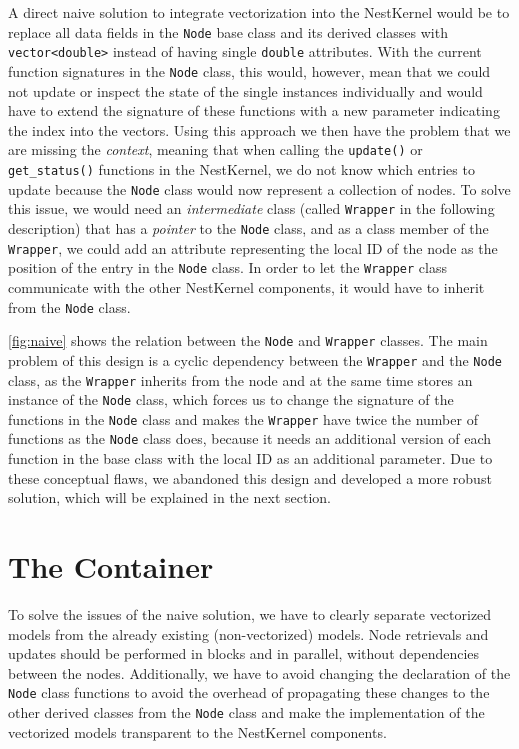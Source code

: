 A direct naive solution to integrate vectorization into the NestKernel would be to replace all data fields in the \texttt{Node} base class and its derived classes with \texttt{vector<double>} instead of having single \texttt{double} attributes. With the current function signatures in the \texttt{Node} class, this would, however, mean that we could not update or inspect the state of the single instances individually and would have to extend the signature of these functions with a new parameter indicating the index into the vectors. Using this approach we then have the problem that we are missing the \emph{context}, meaning that when calling the \texttt{update()} or \texttt{get\_status()} functions in the NestKernel, we do not know which entries to update because the \texttt{Node} class would now represent a collection of nodes. To solve this issue, we would need an \emph{intermediate} class (called \texttt{Wrapper} in the following description) that has a \emph{pointer} to the \texttt{Node} class, and as a class member of the \texttt{Wrapper}, we could add an attribute representing the local ID of the node as the position of the entry in the \texttt{Node} class. In order to let the \texttt{Wrapper} class communicate with the other NestKernel components, it would have to inherit from the \texttt{Node} class.

\autoref{fig:naive} shows the relation between the \texttt{Node} and \texttt{Wrapper} classes. The main problem of this design is a cyclic dependency between the \texttt{Wrapper} and the \texttt{Node} class, as the \texttt{Wrapper} inherits from the node and at the same time stores an instance of the \texttt{Node} class, which forces us to change the signature of the functions in the \texttt{Node} class and makes the \texttt{Wrapper} have twice the number of functions as the \texttt{Node} class does, because it needs an additional version of each function in the base class with the local ID as an additional parameter. Due to these conceptual flaws, we abandoned this design and developed a more robust solution, which will be explained in the next section.

\section{The Container}

To solve the issues of the naive solution, we have to clearly separate vectorized models from the already existing (non-vectorized) models. Node retrievals and updates should be performed in blocks and in parallel, without dependencies between the nodes. Additionally, we have to avoid changing the declaration of the \texttt{Node} class functions to avoid the overhead of propagating these changes to the other derived classes from the \texttt{Node} class and make the implementation of the vectorized models transparent to the NestKernel components.

